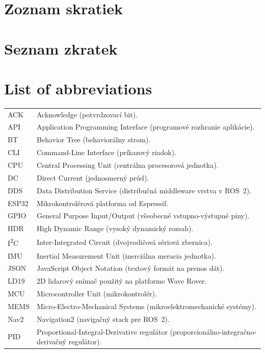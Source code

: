     \section*{Zoznam skratiek}
  \else
    \ifczech
      \section*{Seznam zkratek}
    \else
      \section*{List of abbreviations}
    \fi
  \fi

  \begin{longtable}{p{}p{}}
    ACK & Acknowledge (potvrdzovací bit).\\
    API & Application Programming Interface (programové rozhranie aplikácie).\\
    BT & Behavior Tree (behaviorálny strom).\\
    CLI & Command-Line Interface (príkazový riadok).\\
    CPU & Central Processing Unit (centrálna procesorová jednotka).\\
    DC & Direct Current (jednosmerný prúd).\\
    DDS & Data Distribution Service (distribučná middleware vrstva v ROS~2).\\
    ESP32 & Mikrokontrolérová platforma od Espressif.\\
    GPIO & General Purpose Input/Output (všeobecné vstupno-výstupné piny).\\
    HDR & High Dynamic Range (vysoký dynamický rozsah).\\
    I\textsuperscript{2}C & Inter-Integrated Circuit (dvojvodičová sériová zbernica).\\
    IMU & Inertial Measurement Unit (inerciálna meracia jednotka).\\
    JSON & JavaScript Object Notation (textový formát na prenos dát).\\
    LD19 & 2D lidarový snímač použitý na platforme Wave Rover.\\
    MCU & Microcontroller Unit (mikrokontrolér).\\
    MEMS & Micro-Electro-Mechanical Systems (mikroelektromechanické systémy).\\
    Nav2 & Navigation2 (navigačný stack pre ROS~2).\\
    PID & Proportional-Integral-Derivative regulátor (proporcionálno-integračno-derivačný regulátor).\\

\end{longtable}
